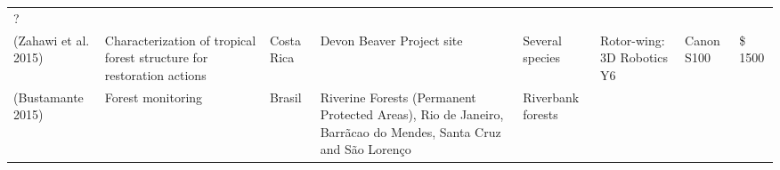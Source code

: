 \documentclass[]{interact}
\theoremstyle{plain}%
\theoremstyle{definition}
\theoremstyle{remark}
\begin{document}
\begin{longtable}[]{@{}llllllll@{}}
\begin{minipage}[t]{0.01\columnwidth}
?\strut
\end{minipage}\tabularnewline
\begin{minipage}[t]{0.11\columnwidth}\raggedright\strut
(Zahawi et al. 2015)\strut
\end{minipage} & \begin{minipage}[t]{0.18\columnwidth}\raggedright\strut
Characterization of tropical forest structure for restoration
actions\strut
\end{minipage} & \begin{minipage}[t]{0.03\columnwidth}\raggedright\strut
Costa Rica\strut
\end{minipage} & \begin{minipage}[t]{0.14\columnwidth}\raggedright\strut
Devon Beaver Project site\strut
\end{minipage} & \begin{minipage}[t]{0.10\columnwidth}\raggedright\strut
Several species\strut
\end{minipage} & \begin{minipage}[t]{0.09\columnwidth}\raggedright\strut
Rotor-wing: 3D Robotics Y6\strut
\end{minipage} & \begin{minipage}[t]{0.11\columnwidth}\raggedright\strut
Canon S100\strut
\end{minipage} & \begin{minipage}[t]{0.01\columnwidth}\raggedright\strut
\$ 1500\strut
\end{minipage}\tabularnewline
\begin{minipage}[t]{0.11\columnwidth}\raggedright\strut
(Bustamante 2015)\strut
\end{minipage} & \begin{minipage}[t]{0.18\columnwidth}\raggedright\strut
Forest monitoring\strut
\end{minipage} & \begin{minipage}[t]{0.03\columnwidth}\raggedright\strut
Brasil\strut
\end{minipage} & \begin{minipage}[t]{0.14\columnwidth}\raggedright\strut
Riverine Forests (Permanent Protected Areas), Rio de Janeiro, Barrãcao
do Mendes, Santa Cruz and São Lorenço\strut
\end{minipage} & \begin{minipage}[t]{0.10\columnwidth}\raggedright\strut
Riverbank forests\strut
\end{minipage} & \begin{minipage}[t]{0.09\columnwidth}\raggedright\strut

\end{minipage}
\end{longtable}
\end{document}
